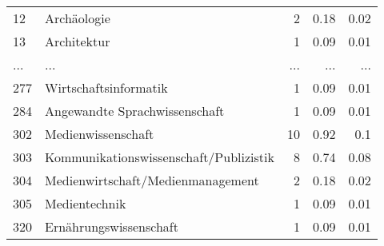 \begin{longtable}{lXrrr}
        12 & \multicolumn{1}{X}{Archäologie} & %
          \num{2} &
          \num[round-mode=places,round-precision=2]{0.18} &
          \num[round-mode=places,round-precision=2]{0.02} \\
        13 & \multicolumn{1}{X}{Architektur} & %
          \num{1} &
          \num[round-mode=places,round-precision=2]{0.09} &
          \num[round-mode=places,round-precision=2]{0.01} \\
       ... & ... & ... & ... & ... \\
        277 & \multicolumn{1}{X}{Wirtschaftsinformatik} & %
          \num{1} &
          \num[round-mode=places,round-precision=2]{0.09} &
          \num[round-mode=places,round-precision=2]{0.01} \\

        284 & \multicolumn{1}{X}{Angewandte Sprachwissenschaft} & %
          \num{1} &
          \num[round-mode=places,round-precision=2]{0.09} &
          \num[round-mode=places,round-precision=2]{0.01} \\

        302 & \multicolumn{1}{X}{Medienwissenschaft} & %
          \num{10} &
          \num[round-mode=places,round-precision=2]{0.92} &
          \num[round-mode=places,round-precision=2]{0.1} \\

        303 & \multicolumn{1}{X}{Kommunikationswissenschaft/Publizistik} & %
          \num{8} &
          \num[round-mode=places,round-precision=2]{0.74} &
          \num[round-mode=places,round-precision=2]{0.08} \\

        304 & \multicolumn{1}{X}{Medienwirtschaft/Medienmanagement} & %
          \num{2} &
          \num[round-mode=places,round-precision=2]{0.18} &
          \num[round-mode=places,round-precision=2]{0.02} \\

        305 & \multicolumn{1}{X}{Medientechnik} & %
          \num{1} &
          \num[round-mode=places,round-precision=2]{0.09} &
          \num[round-mode=places,round-precision=2]{0.01} \\

        320 & \multicolumn{1}{X}{Ernährungswissenschaft} & %
          \num{1} &
          \num[round-mode=places,round-precision=2]{0.09} &
          \num[round-mode=places,round-precision=2]{0.01} \\


\end{longtable}
